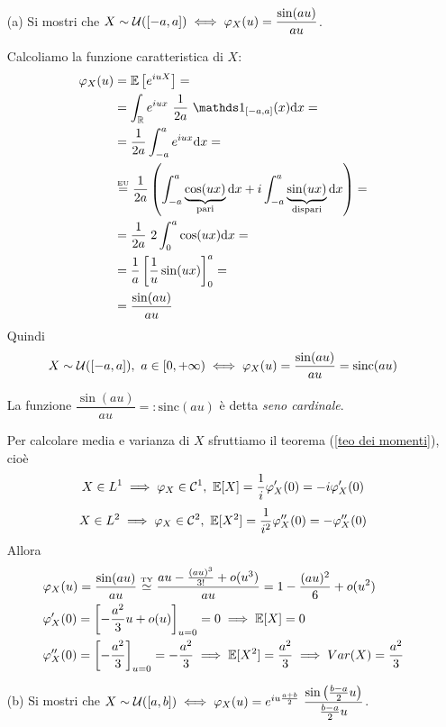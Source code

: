 \Soluzione{} %
\begin{enumerate}
\item [(a)] Si mostri che $X\sim \mathcal{U}([-a,a])\iff\varphi_X(u)=\dfrac{\sin(au)}{au}$.

Calcoliamo la funzione caratteristica di $X$:
\begin{gather*}
\begin{aligned}
\varphi_X(u)&=\EE\left[e^{iuX}  \right]=\\
&=\int_\RR e^{iux}\ \frac{1}{2a}\ \Ind_{[-a,a]}(x)\dx=\\
&=\frac{1}{2a}\int_{-a}^ae^{iux}\dx=\\
&\overset{\underset{\text{EU}}{}}{=}\frac{1}{2a}\left(\int_{-a}^a\underbrace{\cos(ux)}_{\text{pari}}\dx+i\int_{-a}^a\underbrace{\sin(ux)}_{\text{dispari}}\dx  \right)=\\
&=\frac{1}{2a}\ 2\int_{0}^a\cos(ux)\dx=\\
&=\frac{1}{a}\left[\frac{1}{u} \sin(ux)  \right]_0^a=\\
&=\frac{\sin(au)}{au}
\end{aligned}
\end{gather*}
Quindi
\[
X\sim \Uc([-a,a]),\ a\in[0,+\infty)\iff\varphi_X(u)=\frac{\sin(au)}{au}=\text{sinc}(au)
\]
\begin{oss}
La funzione $\dfrac{\sin(au)}{au}=:\text{sinc}(au)$ è detta \emph{seno cardinale}.
\end{oss}
Per calcolare media e varianza di $X$ sfruttiamo il teorema (\ref{teo dei momenti}), cioè
\[
X\in L^1\implies\varphi_X\in\Cu,\ \EE[X]=\frac{1}{i}\varphi_X'(0)=-i\varphi_X'(0)
\]
\[
X\in L^2\implies\varphi_X\in\mathcal{C}^2,\ \EE[X^2]=\frac{1}{i^2}\varphi_X''(0)=-\varphi_X''(0)
\]
Allora
\begin{gather*}
\begin{aligned}
&\varphi_X(u)=\frac{\sin(au)}{au}\overset{\underset{\text{TY}}{}}{\simeq}\frac{au-\frac{(au)^3}{3!}+o(u^3)}{au}=1-\frac{(au)^2}{6}+o(u^2) \\
&\varphi_X'(0)=\left[-\frac{a^2}{3}u+o(u) \right]_{u=0}=0\implies\mathbb{E}[X]=0\\
&\varphi_X''(0)=\left[-\frac{a^2}{3} \right]_{u=0}=-\frac{a^2}{3}\implies\mathbb{E}[X^2]=\frac{a^2}{3}\implies Var(X)=\frac{a^2}{3}\\
\end{aligned}
\end{gather*}

\item [(b)] Si mostri che $X\sim  \Uc([a,b])\iff\varphi_X(u)=e^{iu\frac{a+b}{2}}\ \dfrac{\sin\left(\frac{b-a}{2}u\right)}{\frac{b-a}{2}u}$.


\end{enumerate}
